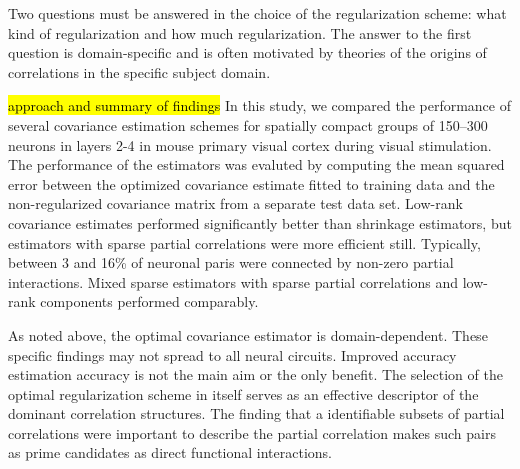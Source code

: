 
Two questions must be answered in the choice of the regularization scheme: what kind of regularization and how much regularization. The answer to the first question is domain-specific and is often motivated by theories of the origins of correlations in the specific subject domain.  


\hl{\tiny approach and summary of findings} 
In this study, we compared the performance of several covariance estimation schemes for spatially compact groups of 150--300 neurons in layers 2-4 in mouse primary visual cortex during visual stimulation.   The performance of the estimators was evaluted by computing the mean squared error between the optimized covariance estimate fitted to training data and the non-regularized covariance matrix from a separate test data set.  Low-rank covariance estimates performed significantly better than shrinkage estimators, but estimators with sparse partial correlations were more efficient still. Typically, between 3 and 16\% of neuronal paris were connected by non-zero partial interactions.  Mixed sparse estimators with sparse partial correlations and low-rank components performed comparably. 

As noted above, the optimal covariance estimator is domain-dependent. 
These specific findings may not spread to all neural circuits.
Improved accuracy estimation accuracy is not the main aim or the only benefit.  
The selection of the optimal regularization scheme in itself serves as an effective descriptor of the dominant correlation structures. The finding that a identifiable subsets of partial correlations were important to describe the partial correlation makes such pairs as prime candidates as direct functional interactions. 